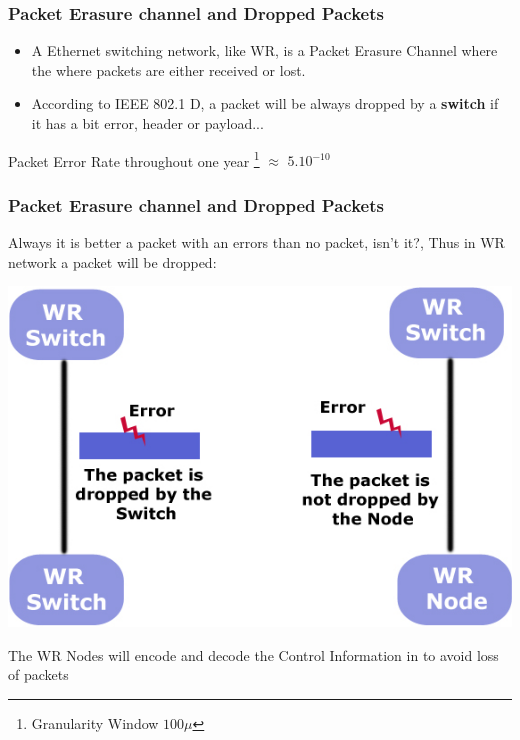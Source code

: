 \documentclass[]{beamer}
\begin{document}
\begin{frame}
\frametitle{Packet Erasure channel and Dropped Packets}

\begin{itemize}
	\item A Ethernet switching network, like WR, is a Packet Erasure Channel where the where packets are either received or lost.

\item According to IEEE 802.1 D, a packet will be always dropped by a \textbf{ switch} if it has a bit error, header or payload... 
\end{itemize}

Packet Error Rate throughout one year \footnote{Granularity Window $100\mu$}  $\approx$ $5.10^{-10}$

\end{frame}

\begin{frame}

\frametitle{Packet Erasure channel and Dropped Packets}

Always it is better a packet with an errors than no packet, isn't it?, Thus in WR network a packet will be dropped:

\begin{center}
  \includegraphics[scale=0.30]{../../figures/robustness/dropped_packet}


\end{center}
The WR Nodes will encode and decode the Control Information in to avoid loss of packets
\end{frame}
\end{document}
